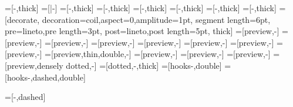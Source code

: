 \usetikzlibrary{decorations,decorations.pathmorphing,decorations.markings}
=[-\@mmtarrowtip,thick] 
=[|-\@mmtarrowtip] %
=[-\@mmtarrowtip,thick]
=[\@mmtarrowtipmonoright-\@mmtarrowtip,thick]
=[\@mmtarrowtip-\@mmtarrowtipmonoright,thick]
=[\@mmtarrowtipmonoright-\@mmtarrowtippartial,thick]
=[\@mmtarrowtipmonoleft-\@mmtarrowtip,thick]
=[\@mmtarrowtipmonoleft-\@mmtarrowtippartialleft,thick]
=[decorate,
                                decoration={coil,aspect=0,amplitude=1pt,
                                                    segment length=6pt,
                                                    pre=lineto,pre length=3pt,
                                                    post=lineto,post length=5pt},
                                thick]
=[preview,-\@mmtarrowtip]
=[preview,\@mmtarrowtipmonoright-\@mmtarrowtip]
=[preview,-\@mmtarrowtippartial]
=[preview,\@mmtarrowtipmonoright-\@mmtarrowtippartial]
=[preview,-\@mmtarrowtip]
=[preview,\@mmtarrowtipmonoleft-\@mmtarrowtip]
=[preview,-\@mmtarrowtippartialleft]
=[preview,\@mmtarrowtipmonoleft-\@mmtarrowtippartialleft]
=[preview,thin,double,-\@mmtarrowtip]
=[preview,\@mmtarrowtip-\@mmtarrowtip]
=[preview,\@mmtreversearrowtippartial-\@mmtarrowtippartial]
=[preview,\@mmtreversearrowtippartialleft-\@mmtarrowtippartialleft]
=[preview,densely dotted,-\@mmtarrowtip]
=[dotted,-\@mmtarrowtip,thick]
=[hooks-\@mmtarrowtip,double] 
=[hooks-\@mmtarrowtip,dashed,double] 


=[\@mmtarrowtip-\@mmtarrowtip,dashed]

